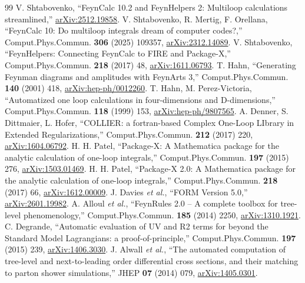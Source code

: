 \documentclass[a4paper,10pt]{ltjsarticle}
\begin{document}
\begin{thebibliography}{99}
\small
{} V. Shtabovenko, ``FeynCalc 10.2 and FeynHelpers 2: Multiloop calculations streamlined,'' \href{https://arxiv.org/abs/2512.19858}{arXiv:2512.19858}.
 V. Shtabovenko, R. Mertig, F. Orellana, ``FeynCalc 10: Do multiloop integrals dream of computer codes?,'' Comput.Phys.Commun. \textbf{306} (2025) 109357, \href{https://arxiv.org/abs/2312.14089}{arXiv:2312.14089}.
 V. Shtabovenko, ``FeynHelpers: Connecting FeynCalc to FIRE and Package-X,'' Comput.Phys.Commun. \textbf{218} (2017) 48, \href{https://arxiv.org/abs/1611.06793}{arXiv:1611.06793}.
 T. Hahn, ``Generating Feynman diagrams and amplitudes with FeynArts 3,'' Comput.Phys.Commun. \textbf{140} (2001) 418, \href{https://arxiv.org/abs/hep-ph/0012260}{arXiv:hep-ph/0012260}.
 T. Hahn, M. Perez-Victoria, ``Automatized one loop calculations in four-dimensions and D-dimensions,'' Comput.Phys.Commun. \textbf{118} (1999) 153, \href{https://arxiv.org/abs/hep-ph/9807565}{arXiv:hep-ph/9807565}.
 A. Denner, S. Dittmaier, L. Hofer, ``COLLIER: a fortran-based Complex One-Loop LIbrary in Extended Regularizations,'' Comput.Phys.Commun. \textbf{212} (2017) 220, \href{https://arxiv.org/abs/1604.06792}{arXiv:1604.06792}.
 H. H. Patel, ``Package-X: A Mathematica package for the analytic calculation of one-loop integrals,'' Comput.Phys.Commun. \textbf{197} (2015) 276, \href{https://arxiv.org/abs/1503.01469}{arXiv:1503.01469}.
 H. H. Patel, ``Package-X 2.0: A Mathematica package for the analytic calculation of one-loop integrals,'' Comput.Phys.Commun. \textbf{218} (2017) 66, \href{https://arxiv.org/abs/1612.00009}{arXiv:1612.00009}.
 J. Davies \textit{et al.}, ``FORM Version 5.0,'' \href{https://arxiv.org/abs/2601.19982}{arXiv:2601.19982}.
 A. Alloul \textit{et al.}, ``FeynRules 2.0 -- A complete toolbox for tree-level phenomenology,'' Comput.Phys.Commun. \textbf{185} (2014) 2250, \href{https://arxiv.org/abs/1310.1921}{arXiv:1310.1921}.
 C. Degrande, ``Automatic evaluation of UV and R2 terms for beyond the Standard Model Lagrangians: a proof-of-principle,'' Comput.Phys.Commun. \textbf{197} (2015) 239, \href{https://arxiv.org/abs/1406.3030}{arXiv:1406.3030}.
 J. Alwall \textit{et al.}, ``The automated computation of tree-level and next-to-leading order differential cross sections, and their matching to parton shower simulations,'' JHEP \textbf{07} (2014) 079, \href{https://arxiv.org/abs/1405.0301}{arXiv:1405.0301}.

\end{thebibliography}
\end{document}
